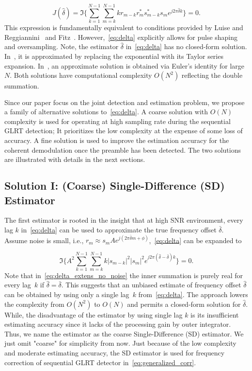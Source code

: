 \begin{equation}
    \label{eq:delta}
    J(\hat{\delta}) = \Im\bigg\{\sum_{k=1}^{N-1}{\sum_{m=k}^{N-1}{kr_{m-k}r_m^{*}s_{m-k}^{*}s_m}e^{j2\pi\hat{\delta}k}}\bigg\}=0.
    \end{equation}
This expression is fundamentally equivalent to conditions provided by Luise and Reggiannini~\cite{Luise_Reggiannini_95} and Fitz~\cite{Fitz_94}.
However,~\eqref{eq:delta} explicitly allows for pulse shaping and oversampling.
Note, the estimator $\hat{\delta}$ in~\eqref{eq:delta} has no closed-form
solution.
In~\cite{Luise_Reggiannini_95}, it is approximated by replacing the exponential with its
Taylor series expansion.
In~\cite{Fitz_94}, an approximate solution is obtained via Euler's
identity for large $N$.
Both solutions have computational complexity $O(N^2)$ reflecting the
double summation.

Since our paper focus on the joint detection and estimation problem, we propose a family of alternative solutions to~\eqref{eq:delta}.
A coarse solution with $O(N)$ complexity is used for operating at high sampling
rate during the sequential GLRT detection;
It prioritizes the low complexity at the expense of some loss of accuracy. 
A fine solution is used to improve the estimation accuracy 
for the coherent demodulation once the preamble has been detected.
The two solutions are illustrated with details in the next sections.

\subsection{Solution I: (Coarse) Single-Difference (SD) Estimator}

The first estimator is rooted in the insight that at high SNR environment, every lag $k$ in~\eqref{eq:delta} can be used to
approximate the true frequency offset $\bar{\delta}$. Assume noise is small, i.e.,
$r_m \approx s_mAe^{j(2\pi \bar{\delta} m+\phi)}$,~\eqref{eq:delta} can be expanded to

\begin{equation}
    \label{eq:delta_extens_no_noise}
    \Im\bigg\{A^2\sum_{k=1}^{N-1}\sum_{m=k}^{N-1}k|s_{m-k}|^2|s_m|^2e^{j2\pi (\hat{\delta}-\bar{\delta})k}\bigg\}=0.
    \end{equation}
Note that in~\eqref{eq:delta_extens_no_noise} the inner summation is purely real for every lag~$k$ if $\hat{\delta}=\bar{\delta}$.
This suggests that an unbiased estimate of frequency offset $\hat{\delta}$ can be obtained by using only a single lag~$k$
from~\eqref{eq:delta}. The approach lowers the complexity from $O(N^2)$ to $O(N)$ and permits a closed-form solution for $\hat{\delta}$.  
While, the disadvantage of the estimator by using single lag $k$ is its insufficient estimating accuracy since it lacks of the processing gain by outer integrator.
Thus, we name the estimator as the coarse Single-Difference (SD) estimator. We just omit "coarse" for simplicity from now.
Just because of the low complexity and moderate estimating accuracy, 
the SD estimator is used for frequency correction of sequential GLRT detector in~\eqref{eq:generalized_corr}. 

